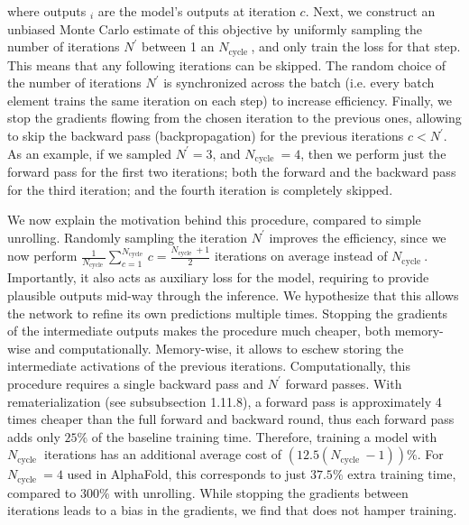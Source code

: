 \documentclass[10pt]{article}
\begin{document}
where outputs ${ }_{i}$ are the model's outputs at iteration $c$. Next, we construct an unbiased Monte Carlo estimate of this objective by uniformly sampling the number of iterations $N^{\prime}$ between 1 an $N_{\text {cycle }}$, and only train the loss for that step. This means that any following iterations can be skipped. The random choice of the number of iterations $N^{\prime}$ is synchronized across the batch (i.e. every batch element trains the same iteration on each step) to increase efficiency. Finally, we stop the gradients flowing from the chosen iteration to the previous ones, allowing to skip the backward pass (backpropagation) for the previous iterations $c<N^{\prime}$. As an example, if we sampled $N^{\prime}=3$, and $N_{\text {cycle }}=4$, then we perform just the forward pass for the first two iterations; both the forward and the backward pass for the third iteration; and the fourth iteration is completely skipped.

We now explain the motivation behind this procedure, compared to simple unrolling. Randomly sampling the iteration $N^{\prime}$ improves the efficiency, since we now perform $\frac{1}{N_{\text {cycle }}} \sum_{c=1}^{N_{\text {cycle }}} c=\frac{N_{\text {cycle }}+1}{2}$ iterations on average instead of $N_{\text {cycle }}$. Importantly, it also acts as auxiliary loss for the model, requiring to provide plausible outputs mid-way through the inference. We hypothesize that this allows the network to refine its own predictions multiple times. Stopping the gradients of the intermediate outputs makes the procedure much cheaper, both memory-wise and computationally. Memory-wise, it allows to eschew storing the intermediate activations of the previous iterations. Computationally, this procedure requires a single backward pass and $N^{\prime}$ forward passes. With rematerialization (see subsubsection 1.11.8), a forward pass is approximately 4 times cheaper than the full forward and backward round, thus each forward pass adds only $25 \%$ of the baseline training time. Therefore, training a model with $N_{\text {cycle }}$ iterations has an additional average cost of $\left(12.5\left(N_{\text {cycle }}-1\right)\right) \%$. For $N_{\text {cycle }}=4$ used in AlphaFold, this corresponds to just $37.5 \%$ extra training time, compared to $300 \%$ with unrolling. While stopping the gradients between iterations leads to a bias in the gradients, we find that does not hamper training.
\end{document}
